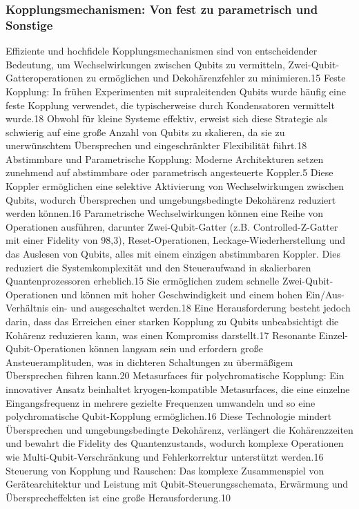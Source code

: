 \subsubsection{Kopplungsmechanismen: Von fest zu parametrisch und Sonstige}
Effiziente und hochfidele Kopplungsmechanismen sind von entscheidender Bedeutung, um Wechselwirkungen zwischen Qubits zu vermitteln, Zwei-Qubit-Gatteroperationen zu ermöglichen und Dekohärenzfehler zu minimieren.15
Feste Kopplung: In frühen Experimenten mit supraleitenden Qubits wurde häufig eine feste Kopplung verwendet, die typischerweise durch Kondensatoren vermittelt wurde.18 Obwohl für kleine Systeme effektiv, erweist sich diese Strategie als schwierig auf eine große Anzahl von Qubits zu skalieren, da sie zu unerwünschtem Übersprechen und eingeschränkter Flexibilität führt.18
Abstimmbare und Parametrische Kopplung: Moderne Architekturen setzen zunehmend auf abstimmbare oder parametrisch angesteuerte Koppler.5 Diese Koppler ermöglichen eine selektive Aktivierung von Wechselwirkungen zwischen Qubits, wodurch Übersprechen und umgebungsbedingte Dekohärenz reduziert werden können.16 Parametrische Wechselwirkungen können eine Reihe von Operationen ausführen, darunter Zwei-Qubit-Gatter (z.B. Controlled-Z-Gatter mit einer Fidelity von 98,3), Reset-Operationen, Leckage-Wiederherstellung und das Auslesen von Qubits, alles mit einem einzigen abstimmbaren Koppler. Dies reduziert die Systemkomplexität und den Steueraufwand in skalierbaren Quantenprozessoren erheblich.15 Sie ermöglichen zudem schnelle Zwei-Qubit-Operationen und können mit hoher Geschwindigkeit und einem hohen Ein/Aus-Verhältnis ein- und ausgeschaltet werden.18 Eine Herausforderung besteht jedoch darin, dass das Erreichen einer starken Kopplung zu Qubits unbeabsichtigt die Kohärenz reduzieren kann, was einen Kompromiss darstellt.17 Resonante Einzel-Qubit-Operationen können langsam sein und erfordern große Ansteueramplituden, was in dichteren Schaltungen zu übermäßigem Übersprechen führen kann.20
Metasurfaces für polychromatische Kopplung: Ein innovativer Ansatz beinhaltet kryogen-kompatible Metasurfaces, die eine einzelne Eingangsfrequenz in mehrere gezielte Frequenzen umwandeln und so eine polychromatische Qubit-Kopplung ermöglichen.16 Diese Technologie mindert Übersprechen und umgebungsbedingte Dekohärenz, verlängert die Kohärenzzeiten und bewahrt die Fidelity des Quantenzustands, wodurch komplexe Operationen wie Multi-Qubit-Verschränkung und Fehlerkorrektur unterstützt werden.16
Steuerung von Kopplung und Rauschen: Das komplexe Zusammenspiel von Gerätearchitektur und Leistung mit Qubit-Steuerungsschemata, Erwärmung und Übersprecheffekten ist eine große Herausforderung.10

